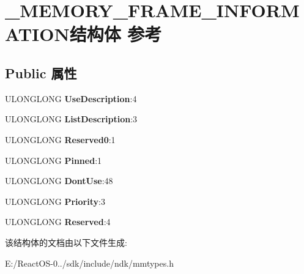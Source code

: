 \hypertarget{struct___m_e_m_o_r_y___f_r_a_m_e___i_n_f_o_r_m_a_t_i_o_n}{}\section{\+\_\+\+M\+E\+M\+O\+R\+Y\+\_\+\+F\+R\+A\+M\+E\+\_\+\+I\+N\+F\+O\+R\+M\+A\+T\+I\+O\+N结构体 参考}
\label{struct___m_e_m_o_r_y___f_r_a_m_e___i_n_f_o_r_m_a_t_i_o_n}
\subsection*{Public 属性}
\begin{DoxyCompactItemize}
\item 
\mbox{\label{struct___m_e_m_o_r_y___f_r_a_m_e___i_n_f_o_r_m_a_t_i_o_n_a730f3fee9539f417e9656d77de48ef41}} 
U\+L\+O\+N\+G\+L\+O\+NG {\bfseries Use\+Description}\+:4
\item 
\mbox{\label{struct___m_e_m_o_r_y___f_r_a_m_e___i_n_f_o_r_m_a_t_i_o_n_a4f20f0ab54a3481a9bec8332cbd61b83}} 
U\+L\+O\+N\+G\+L\+O\+NG {\bfseries List\+Description}\+:3
\item 
\mbox{\label{struct___m_e_m_o_r_y___f_r_a_m_e___i_n_f_o_r_m_a_t_i_o_n_a4c863d357e9d62735f089954cb857137}} 
U\+L\+O\+N\+G\+L\+O\+NG {\bfseries Reserved0}\+:1
\item 
\mbox{\label{struct___m_e_m_o_r_y___f_r_a_m_e___i_n_f_o_r_m_a_t_i_o_n_aabce7340b3a33ba595a4e6fef17930aa}} 
U\+L\+O\+N\+G\+L\+O\+NG {\bfseries Pinned}\+:1
\item 
\mbox{\label{struct___m_e_m_o_r_y___f_r_a_m_e___i_n_f_o_r_m_a_t_i_o_n_ae446873dbf9eefdd40aaef0c5d0ff2f8}} 
U\+L\+O\+N\+G\+L\+O\+NG {\bfseries Dont\+Use}\+:48
\item 
\mbox{\label{struct___m_e_m_o_r_y___f_r_a_m_e___i_n_f_o_r_m_a_t_i_o_n_a86767cb63ca5364e304534b28a33e828}} 
U\+L\+O\+N\+G\+L\+O\+NG {\bfseries Priority}\+:3
\item 
\mbox{\label{struct___m_e_m_o_r_y___f_r_a_m_e___i_n_f_o_r_m_a_t_i_o_n_a372a0c54dbc2d6a65134649a93f39838}} 
U\+L\+O\+N\+G\+L\+O\+NG {\bfseries Reserved}\+:4
\end{DoxyCompactItemize}


该结构体的文档由以下文件生成\+:\begin{DoxyCompactItemize}
\item 
E\+:/\+React\+O\+S-\/0../sdk/include/ndk/mmtypes.\+h\end{DoxyCompactItemize}

